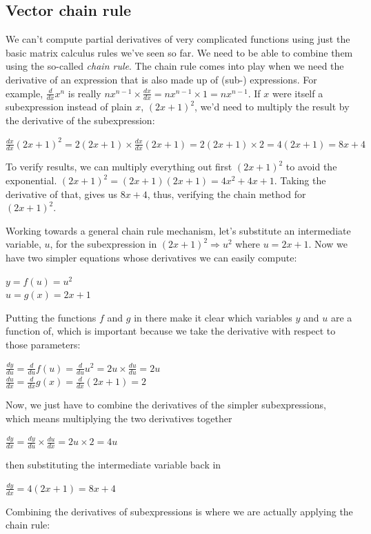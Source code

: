 \documentclass[11pt]{article}
\begin{document}
\subsection{Vector chain rule}

We can't compute partial derivatives of very complicated functions using just the basic matrix calculus rules we've seen so far. We need to be able to combine them using the so-called {\em chain rule}.  The chain rule comes into play when we need the derivative of an expression that is also made up of (sub-) expressions. For example, $\frac{d}{dx} x^n$ is really $nx^{n-1} \times \frac{dx}{dx} = nx^{n-1} \times 1 = nx^{n-1}$. If $x$ were itself a subexpression instead of plain $x$, $(2x+1)^2$, we'd need to multiply the result by the derivative of the subexpression: 

$\frac{dx}{dx} (2x+1)^2 = 2 (2x+1) \times \frac{dx}{dx} (2x+1) = 2 (2x+1) \times 2 = 4(2x+1) = 8x+4$

To verify results, we can multiply everything out first $(2x+1)^2$ to avoid the exponential. $(2x+1)^2 = (2x+1)(2x+1) = 4x^2 + 4x + 1$. Taking the derivative of that, gives us $8x + 4$, thus, verifying the  chain method for $(2x+1)^2$.

Working towards a general chain rule mechanism, let's substitute an intermediate variable, $u$, for the subexpression in $(2x+1)^2 \Rightarrow u^2$ where $u = 2x+1$. Now we have two simpler equations whose derivatives we can easily compute:

$y = f(u) = u^2$\\
$u = g(x) = 2x+1$

Putting the functions $f$ and $g$ in there make it clear which variables $y$ and $u$ are a function of, which is important because we take the derivative with respect to those parameters:

$\frac{dy}{du} = \frac{d}{du} f(u) = \frac{d}{du} u^2 = 2u \times \frac{du}{du} = 2u$\\
$\frac{du}{dx} = \frac{d}{dx} g(x) = \frac{d}{dx} (2x+1) = 2$

Now, we just have to combine the derivatives of the simpler subexpressions, which means multiplying the two derivatives together

$\frac{dy}{dx} = \frac{dy}{du} \times \frac{du}{dx} = 2 u \times 2 = 4u$

then substituting the intermediate variable back in

$\frac{dy}{dx} = 4(2x+1) = 8x+4$

Combining the derivatives of subexpressions is where we are actually applying the chain rule:
\end{document}
